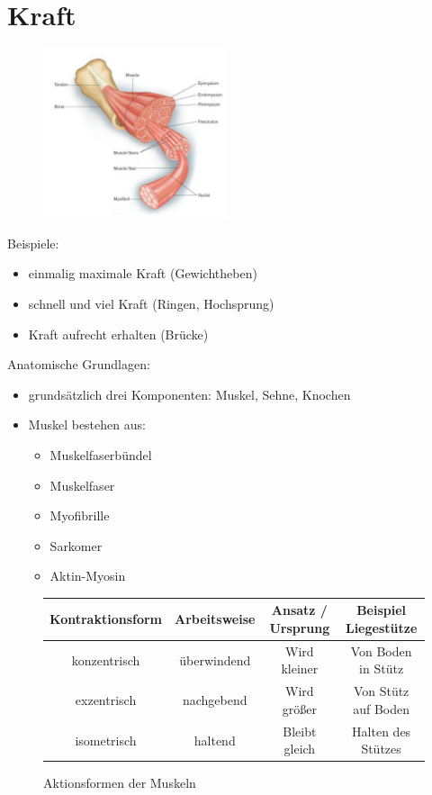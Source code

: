 
\section{Kraft}

\begin{figure}
    \begin{center}
        \includegraphics[width=0.48\textwidth]{pictures/muskeln}
    \end{center}
\end{figure}

Beispiele:
\begin{itemize}
    \item einmalig maximale Kraft (Gewichtheben)
    \item schnell und viel Kraft (Ringen, Hochsprung)
    \item Kraft aufrecht erhalten (Brücke)
\end{itemize}

Anatomische Grundlagen:
\begin{itemize}
    \item grundsätzlich drei Komponenten: Muskel, Sehne, Knochen
    \item Muskel bestehen aus:
    \begin{itemize}
        \item Muskelfaserbündel
        \item Muskelfaser
        \item Myofibrille
        \item Sarkomer
        \item Aktin-Myosin
    \end{itemize}
\end{itemize}

\begin{figure}[h]
\centering
\begin{tabular}{|c|c|c|c|}
 \hline
Kontraktionsform & Arbeitsweise & Ansatz / Ursprung & Beispiel Liegestütze \\ \hline \hline
konzentrisch & überwindend & Wird kleiner & Von Boden in Stütz \\ \hline
exzentrisch & nachgebend & Wird größer & Von Stütz auf Boden \\ \hline
isometrisch & haltend & Bleibt gleich & Halten des Stützes \\ \hline
\end{tabular}
\caption{Aktionsformen der Muskeln}
\end{figure}

